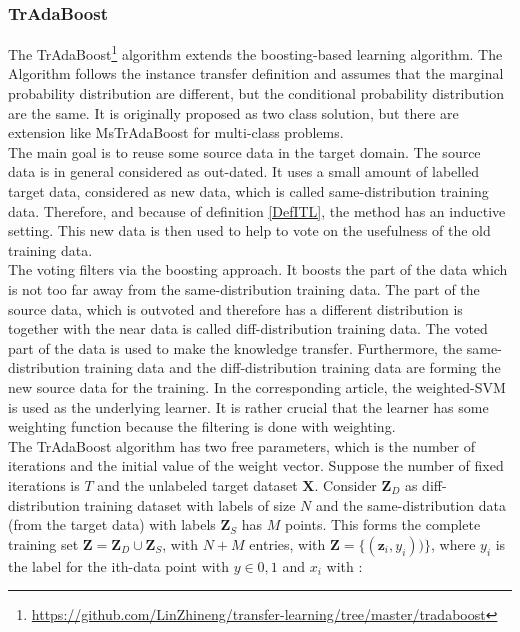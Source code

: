 \subsubsection{TrAdaBoost}
The TrAdaBoost\footnote{\url{https://github.com/LinZhineng/transfer-learning/tree/master/tradaboost}} algorithm extends the boosting-based learning algorithm.
The Algorithm follows the instance transfer definition and assumes that the marginal probability distribution are different, but the conditional probability distribution are the same.\cite{Dai.}
It is originally proposed as two class solution, but there are extension like MsTrAdaBoost for multi-class problems.\cite{Huang.2012}\\
The main goal is to reuse some source data in the target domain.
The source data is in general considered as out-dated.
It uses a small amount of labelled target data, considered as new data, which is called same-distribution training data.
Therefore, and because of definition \ref{DefITL}, the method has an inductive setting.
This new data is then used to help to vote on the usefulness of the old training data.\cite{Dai.}\\
The voting filters via the boosting approach.
It boosts the part of the data which is not too far away from the same-distribution training data.
The part of the source data, which is outvoted and therefore has a different distribution is together with the near data is called diff-distribution training data.
The voted part of the data is used to make the knowledge transfer.
Furthermore, the same-distribution training data and the diff-distribution training data are forming the new source data for the training.
In the corresponding article, the weighted-\acs{SVM} is used as the underlying learner.
It is rather crucial that the learner has some weighting function because the filtering is done with weighting.\cite{Dai.}\\
The TrAdaBoost algorithm has two free parameters, which is the number of iterations and the initial value of the weight vector.
Suppose the number of fixed iterations is $T$ and the unlabeled target dataset $\mathbf{X}$.
Consider $\mathbf{Z}_D$ as diff-distribution training dataset with labels of size $N$ and the same-distribution data (from the target data) with labels $\mathbf{Z}_S$ has $M$ points.
This forms the complete training set $\mathbf{Z}=\mathbf{Z}_D\cup \mathbf{Z}_S$, with $N+M$ entries, with $\mathbf{\mathbf{Z}}=\{(\mathbf{z}_i,y_i))\}$, where $y_i$ is the label for the ith-data point with $y\in {0,1}$ and $x_i$ with \cite{Dai.}:

